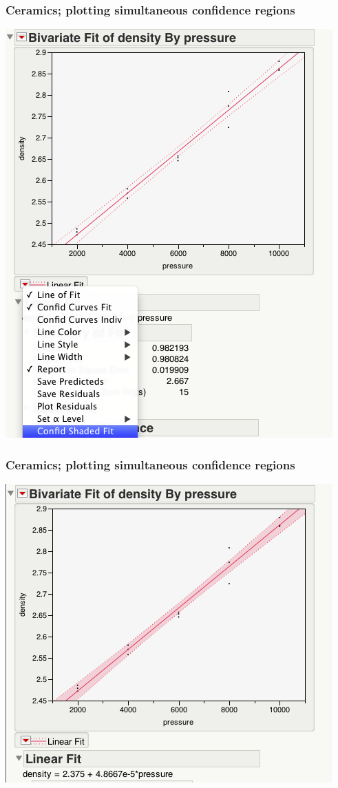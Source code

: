 \documentclass[handout]{beamer}\usepackage{graphicx, color}
\numberwithin{equation}{section}
\begin{document}
\begin{frame}
\frametitle{Ceramics; plotting simultaneous confidence regions}
 \includegraphics{../../fig/scp3.png}
\end{frame}

\begin{frame}
\frametitle{Ceramics; plotting simultaneous confidence regions}
 \includegraphics{../../fig/scp4.png}
\end{frame}
\end{document}
